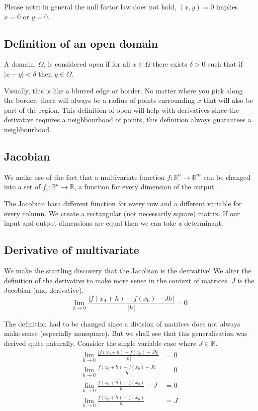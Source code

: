 \documentclass{article}
\begin{document}
Please note: in general the null factor law does not hold, $(x,y) = 0$ implies
$x=0$ or $y=0$.

\subsection{Definition of an open domain}
A domain, $\Omega$, is considered open if for all $x \in \Omega$ there exists
$\delta > 0$ such that if $|x - y| < \delta$ then $y \in \Omega$.

Visually, this is like a blurred edge or border. No matter where you pick along
the border, there will always be a radius of points surrounding $x$ that
will also be part of the region. This definition of open will help with derivatives
since the derivative requires a neighbourhood of points, this definition always
guarantees a neighbourhood.

\subsection{Jacobian}
We make use of the fact that a multivariate function
$f\colon \mathbb{R}^{n} \to \mathbb{R}^{m}$
can be changed into a set of $f_i\colon \mathbb{R}^n \to \mathbb{R}$, a function
for every dimension of the output.

The Jacobian hasa  different function for every row and a different variable
for every column. We create a rectangular (not necessarily square) matrix.
If our input and output dimensions are equal then we can take a determinant.

\subsection{Derivative of multivariate}
We make the startling discovery that the Jacobian is the derivative!
We alter the definition of the derivative to make more sense in the context of
matrices. $J$ is the Jacobian (and derivative).
\[
    \lim_{h \to 0} \frac{|f(x_0 + h) - f(x_0) - Jh|}{|h|} = 0
\]

The definition had to be changed since a division of matrices does not always
make sense (especially nonsquare). But we shall see that this generalisation
was derived quite naturally. Consider the single variable case where
$J \in \mathbb{R}$.
\begin{align*}
    \lim_{h \to 0} \frac{|f(x_0 + h) - f(x_0) - Jh|}{|h|} &= 0 \\
    \lim_{h \to 0} \frac{f(x_0 + h) - f(x_0) - Jh}{h} &= 0 \\
    \lim_{h \to 0} \frac{f(x_0 + h) - f(x_0)}{h} - J &= 0 \\
    \lim_{h \to 0} \frac{f(x_0 + h) - f(x_0)}{h} &= J
\end{align*}
\end{document}
